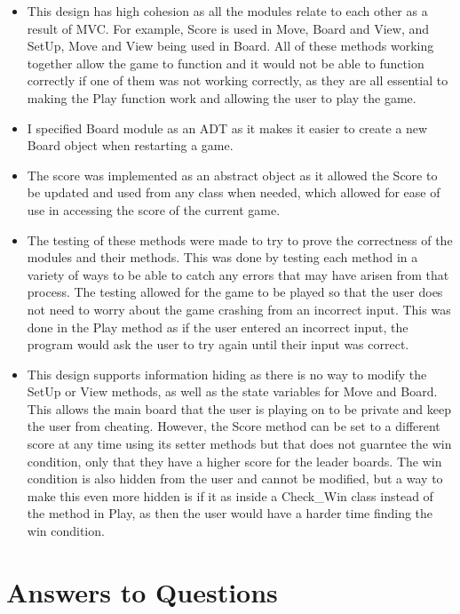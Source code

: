 \documentclass[12pt]{article}
\begin{document}
\begin{itemize}
\item This design has high cohesion as all the modules relate to each other as a result of MVC. For example, Score is used in Move, Board and View, and SetUp, Move and View being used in Board. All of these methods working together allow the game to function and it would not be able to function correctly if one of them was not working correctly, as they are all essential to making the Play function work and allowing the user to play the game. 

\item I specified Board module as an ADT as it makes it easier to create a new Board object when restarting a game. 

\item The score was implemented as an abstract object as it allowed the Score to be updated and used from any class when 
needed, which allowed for ease of use in accessing the score of the current game. 

\item The testing of these methods were made to try to prove the correctness of the modules and their methods. This was done by testing each method in a variety of ways to be able to catch any errors that may have arisen from that process. The testing allowed for the game to be played so that the user does not need to worry about the game crashing from an incorrect input. This was done in the Play method as if the user entered an incorrect input, the program would ask the user to try again until their input was correct. 

\item This design supports information hiding as there is no way to modify the SetUp or View methods, as well as the state variables for Move and Board. This allows the main board that the user is playing on to be private and keep the user from cheating. However, the Score method can be set to a different score at any time using its setter methods but that does not guarntee the win condition, only that they have a higher score for the leader boards. The win condition is also hidden from the user and cannot be modified, but a way to make this even more hidden is if it as inside a Check\_Win class instead of the method in Play, as then the user would have a harder time finding the win condition. 

\end{itemize}

\newpage

\section* {Answers to Questions}
\end{document}
